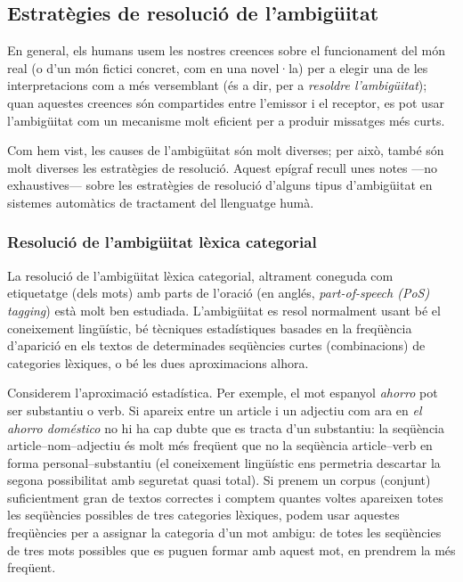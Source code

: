 \subsection{Estratègies de resolució de l'ambigüitat}

En general, els humans usem les nostres creences sobre el funcionament
del món real (o d'un món fictici concret, com en una novel·la) per a
elegir una de les interpretacions com a més versemblant (és a dir, per
a \emph{resoldre l'ambigüitat}); quan aquestes creences són compartides
entre l'emissor i el receptor, es pot usar l'ambigüitat com un
mecanisme molt eficient per a produir missatges més curts.

Com hem vist, les causes de l'ambigüitat són molt diverses; per això,
també són molt diverses les estratègies de resolució. Aquest epígraf
recull unes notes ---no exhaustives--- sobre les estratègies de
resolució d'alguns tipus d'ambigüitat en sistemes automàtics de
tractament del llenguatge humà.

\subsubsection{Resolució de l'ambigüitat lèxica categorial} 
\label{s3:reshom}

La resolució de l'ambigüitat lèxica categorial, altrament coneguda com
etiquetatge (dels mots) amb parts de l'oració (en anglés,
\emph{part-of-speech (PoS) tagging}) està molt ben estudiada.
L'ambigüitat es resol normalment usant bé el coneixement lingüístic,
bé tècniques estadístiques basades en la freqüència d'aparició en els
textos de determinades seqüències curtes (combinacions) de categories
lèxiques, o bé les dues aproximacions alhora.


Considerem l'aproximació estadística. Per exemple, el mot espanyol
\emph{ahorro} pot ser substantiu o verb. Si apareix entre un article i
un adjectiu com ara en \emph{el ahorro doméstico} no hi ha cap dubte
que es tracta d'un substantiu: la seqüència article--nom--adjectiu és
molt més freqüent que no la seqüència article--verb en forma
personal--substantiu (el coneixement lingüístic ens permetria
descartar la segona possibilitat amb seguretat quasi total). Si prenem
un corpus (conjunt) suficientment gran de textos correctes i comptem
quantes voltes apareixen totes les seqüències possibles de tres
categories lèxiques, podem usar aquestes freqüències per a assignar la
categoria d'un mot ambigu: de totes les seqüències de tres mots
possibles que es puguen formar amb aquest mot, en prendrem la més
freqüent. 

